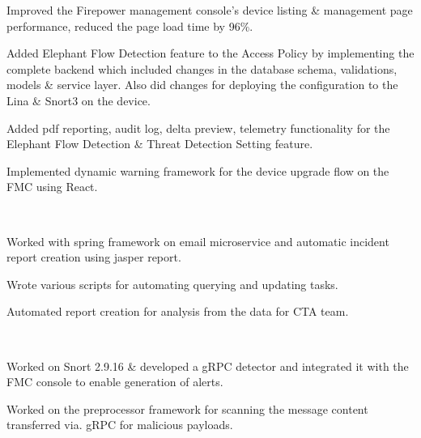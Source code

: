 \documentclass[]{hieudo-build}
\begin{document}
\hfill
\begin{minipage}[t]{0.65\textwidth} 



\vspace{0.9em} %
\begin{tightemize}
\item Improved the Firepower management console's device listing \& management page performance, reduced the page load time by 96\%. 
\item Added Elephant Flow Detection feature to the Access Policy by implementing the complete backend which included changes in the database schema, validations, models \& service layer. Also did changes for deploying the configuration to the Lina \& Snort3 on the device.
\item Added pdf reporting, audit log, delta preview, telemetry functionality for the Elephant Flow Detection \& Threat Detection Setting feature.
\item Implemented dynamic warning framework for the device upgrade flow on the FMC using React.
\end{tightemize}
\sectionsep

\\
\vspace{0.9em} %
\begin{tightemize}
\item Worked with spring framework on email microservice and automatic incident report creation using jasper report. 
\item Wrote various scripts for automating querying and updating tasks. 
\item Automated report creation for analysis from the data for CTA team. 
\end{tightemize}
\sectionsep 

\\
\vspace{0.9em} %
\begin{tightemize}
\item Worked on Snort 2.9.16 \& developed a gRPC detector and integrated it with the FMC console to enable generation of alerts.
\item Worked on the preprocessor framework for scanning the message content transferred via. gRPC for malicious payloads.
\end{tightemize}


\end{minipage}
\end{document}
